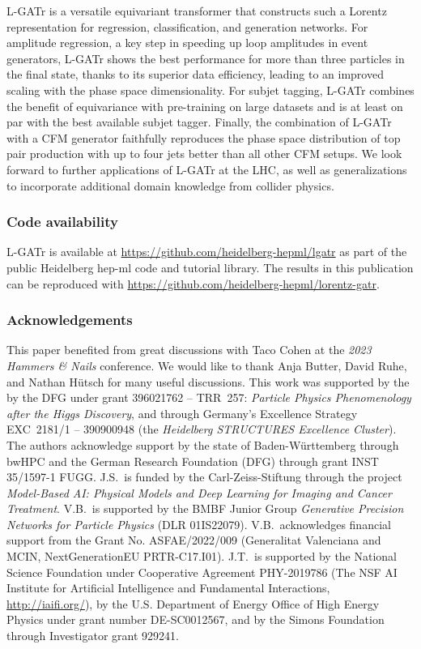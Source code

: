 \documentclass[submission, Phys]{SciPost}
\begin{document}
L-GATr is a versatile  equivariant transformer that constructs such a Lorentz representation for regression, classification, and generation networks.
For amplitude regression, a key step in speeding up loop amplitudes in event generators, L-GATr shows the best performance for more than three particles in the final state, thanks to its superior data efficiency, leading to an improved scaling with the phase space dimensionality.
For subjet tagging, L-GATr combines the benefit of equivariance with pre-training on large datasets and is at least on par with the best available subjet tagger.
Finally, the combination of L-GATr with a CFM generator faithfully reproduces the phase space distribution of top pair production with up to four jets better than all other CFM setups.
%
We look forward to further applications of L-GATr at the LHC, as well as generalizations to incorporate additional domain knowledge from collider physics.

\subsubsection*{Code availability}

L-GATr is available at \url{https://github.com/heidelberg-hepml/lgatr} as part of the public Heidelberg hep-ml code and tutorial library. The results in this publication can be reproduced with \url{https://github.com/heidelberg-hepml/lorentz-gatr}.

\subsubsection*{Acknowledgements}

This paper benefited from great discussions with Taco Cohen at the \textsl{2023 Hammers \& Nails} conference.
We would like to thank Anja Butter, David Ruhe, and Nathan H\"utsch for many useful discussions.
This work was supported by the by the DFG under grant 396021762 -- TRR~257: \textsl{Particle Physics Phenomenology after the   Higgs Discovery}, and through Germany's Excellence Strategy EXC~2181/1 -- 390900948 (the \textsl{Heidelberg STRUCTURES Excellence Cluster}). The authors acknowledge support by the state of Baden-Württemberg through bwHPC
and the German Research Foundation (DFG) through grant INST 35/1597-1 FUGG.
J.S.\ is funded by the Carl-Zeiss-Stiftung through the project \textsl{Model-Based AI: Physical Models and Deep Learning for Imaging and Cancer Treatment}.
V.B.\ is supported by the BMBF Junior Group \textsl{Generative Precision Networks for Particle Physics} (DLR 01IS22079). V.B.\ acknowledges financial support from the Grant No. ASFAE/2022/009 (Generalitat Valenciana and MCIN, NextGenerationEU PRTR-C17.I01).
J.T.\ is supported by the National Science Foundation under Cooperative Agreement PHY-2019786 (The NSF AI Institute for Artificial Intelligence and Fundamental Interactions, \url{http://iaifi.org/}), by the U.S. Department of Energy Office of High Energy Physics under grant number DE-SC0012567, and by the Simons Foundation through Investigator grant 929241.
\end{document}
